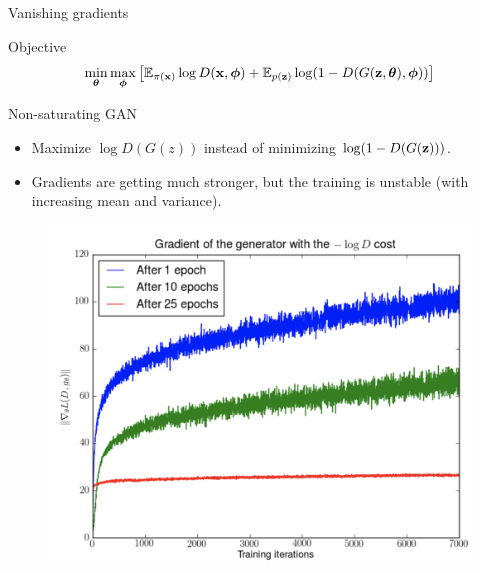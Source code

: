 \begin{frame}{Vanishing gradients}
	\begin{block}{Objective}
		\vspace{-0.4cm}
				\[
					\min_{\boldsymbol{\theta}} \max_{\boldsymbol{\phi}} \left[ \mathbb{E}_{\pi(\mathbf{x})} \log D(\mathbf{x}, \boldsymbol{\phi}) + \mathbb{E}_{p(\mathbf{z})} \log (1 - D(G(\mathbf{z}, \boldsymbol{\theta}), \boldsymbol{\phi})) \right]
				\]
		\vspace{-0.4cm}
	\end{block}
	\begin{minipage}[t]{0.45\columnwidth}
		\begin{block}{Non-saturating GAN}
		\begin{itemize}
			\item Maximize $\log D(G(z))$ instead of minimizing $\log (1 - D(G(\mathbf{z})))$. \\
			\item Gradients are getting much stronger, but the training is unstable (with increasing mean and variance).
		\end{itemize}
		\end{block}
	\end{minipage}%
	\begin{minipage}[t]{0.55\columnwidth}
		\begin{figure}
			\centering
			\includegraphics[width=1.0\linewidth]{figs/vanishing_gradients_3}
		\end{figure}
	\end{minipage}
\end{frame}
